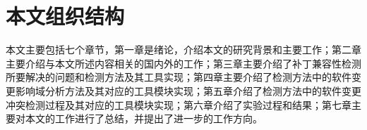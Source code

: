 
%		
%		

%
%
%
%
%


\section{本文组织结构}

本文主要包括七个章节，第一章是绪论，介绍本文的研究背景和主要工作；第二章主要介绍与本文所述内容相关的国内外的工作；第三章主要介绍了补丁兼容性检测所要解决的问题和检测方法及其工具实现；第四章主要介绍了检测方法中的软件变更影响域分析方法及其对应的工具模块实现；第五章介绍了检测方法中的软件变更冲突检测过程及其对应的工具模块实现；第六章介绍了实验过程和结果；第七章主要对本文的工作进行了总结，并提出了进一步的工作方向。



